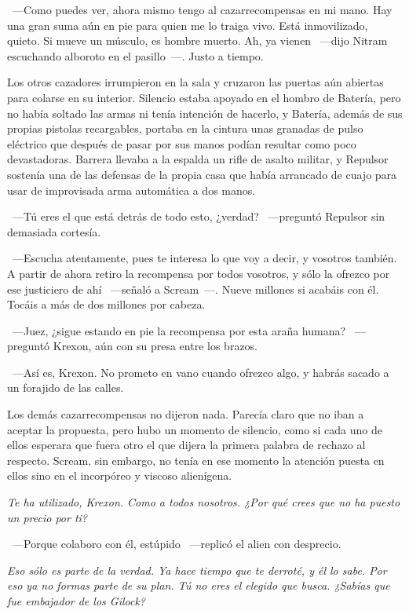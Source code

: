 ~---Como puedes ver, ahora mismo tengo al cazarrecompensas en mi mano. Hay una gran suma aún en pie para quien me lo traiga vivo. Está inmovilizado, quieto. Si mueve un músculo, es hombre muerto. Ah, ya vienen ~---dijo Nitram escuchando alboroto en el pasillo~---. Justo a tiempo.

Los otros cazadores irrumpieron en la sala y cruzaron las puertas aún abiertas para colarse en su interior. Silencio estaba apoyado en el hombro de Batería, pero no había soltado las armas ni tenía intención de hacerlo, y Batería, además de sus propias pistolas recargables, portaba en la cintura unas granadas de pulso eléctrico que después de pasar por sus manos podían resultar como poco devastadoras. Barrera llevaba a la espalda un rifle de asalto militar, y Repulsor sostenía una de las defensas de la propia casa que había arrancado de cuajo para usar de improvisada arma automática a dos manos.

~---Tú eres el que está detrás de todo esto, ¿verdad? ~---preguntó Repulsor sin demasiada cortesía.

~---Escucha atentamente, pues te interesa lo que voy a decir, y vosotros también. A partir de ahora retiro la recompensa por todos vosotros, y sólo la ofrezco por ese justiciero de ahí ~---señaló a Scream~---. Nueve millones si acabáis con él. Tocáis a más de dos millones por cabeza.

~---Juez, ¿sigue estando en pie la recompensa por esta araña humana? ~---preguntó Krexon, aún con su presa entre los brazos.

~---Así es, Krexon. No prometo en vano cuando ofrezco algo, y habrás sacado a un forajido de las calles.

Los demás cazarrecompensas no dijeron nada. Parecía claro que no iban a aceptar la propuesta, pero hubo un momento de silencio, como si cada uno de ellos esperara que fuera otro el que dijera la primera palabra de rechazo al respecto. Scream, sin embargo, no tenía en ese momento la atención puesta en ellos sino en el incorpóreo y viscoso alienígena.

\emph{Te ha utilizado, Krexon. Como a todos nosotros. ¿Por qué crees que no ha puesto un precio por ti?}

~---Porque colaboro con él, estúpido ~---replicó el alien con desprecio.

\emph{Eso sólo es parte de la verdad. Ya hace tiempo que te derroté, y él lo sabe. Por eso ya no formas parte de su plan. Tú no eres el elegido que busca. ¿Sabías que fue embajador de los Gilock?}

